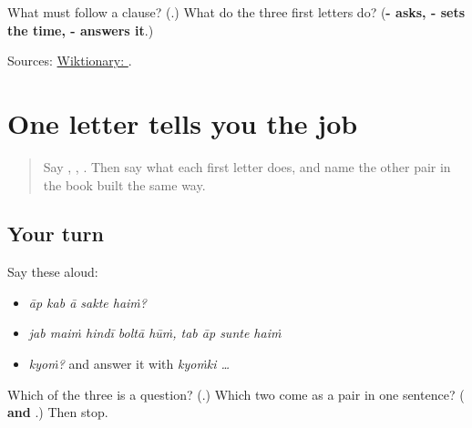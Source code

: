 \begin{tcolorbox}[breakable,colback=teal!4,colframe=teal!35!black,title={Before you move on}]
What must follow a \textbf{} clause? (\textbf{}.) What do the three first letters do? (\textbf{- asks, - sets the time, - answers it}.)

Sources: \href{https://en.wiktionary.org/wiki/\%E0\%A4\%9C\%E0\%A4\%AC}{Wiktionary: }.
\end{tcolorbox}
\section[\texorpdfstring{\hi{कब} · \hi{जब} · \hi{तब} (kab · jab · tab)}{कब · जब · तब (kab · jab · tab)}]{One letter tells you the job}

\label{lesson:HI-R72-when}



\begin{quote}
Say \textbf{}, \textbf{}, \textbf{}. Then say what each first letter does, and name the other pair in the book built the same way.
\end{quote}

\subsection*{Your turn}
Say these aloud:

\begin{itemize}
\raggedright
  \item \emph{āp kab ā sakte haiṁ?}
  \item \emph{jab maiṁ hindī boltā hūṁ, tab āp sunte haiṁ}
  \item \emph{kyoṁ?} and answer it with \emph{kyoṁki …}
\end{itemize}

\begin{tcolorbox}[breakable,colback=teal!4,colframe=teal!35!black,title={Before you move on}]
Which of the three is a question? (\textbf{}.) Which two come as a pair in one sentence? (\textbf{ and }.) Then stop.
\end{tcolorbox}
